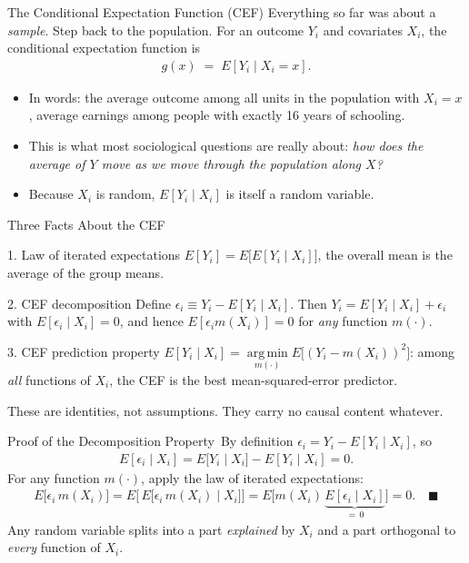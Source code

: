 \documentclass[aspectratio=169,11pt,xcolor=dvipsnames]{beamer}
\DeclareMathOperator*{\argminop}{arg\,min}
\newcommand{\argmin}{\argminop\limits}
\newcommand{\E}{E}
\newcommand{\adv}{\,\raisebox{0.6pt}{\textcolor{accent}{$\bigstar$}}}
\newcommand{\core}{\,\raisebox{0.6pt}{\textcolor{corestar}{$\bigstar$}}}
\begin{document}
\begin{frame}{The Conditional Expectation Function (CEF)}
Everything so far was about a \emph{sample}. Step back to the population.
\vskip4pt
For an outcome $Y_i$ and covariates $X_i$, the \alert{conditional expectation
function} is
\begin{align*}
  g(x) \;=\; \E[Y_i \mid X_i = x] .
\end{align*}
\begin{itemize}\itemsep4pt
  \item In words: the average outcome among all units in the population with
        $X_i = x$, average earnings among people with exactly 16 years of
        schooling.
  \item This is what most sociological questions are really about: \emph{how does
        the average of $Y$ move as we move through the population along $X$?}
  \item Because $X_i$ is random, $\E[Y_i\mid X_i]$ is itself a random variable.
\end{itemize}
\end{frame}

\begin{frame}{Three Facts About the CEF\core}
\begin{block}{1. Law of iterated expectations}
$\E[Y_i] = \E\big[\E[Y_i\mid X_i]\big]$, the overall mean is the average of
the group means.
\end{block}
\pause
\begin{block}{2. CEF decomposition}
Define $\epsilon_i \equiv Y_i - \E[Y_i\mid X_i]$. Then $Y_i = \E[Y_i\mid X_i] + \epsilon_i$
with $\E[\epsilon_i\mid X_i] = 0$, and hence $\E[\epsilon_i m(X_i)] = 0$ for
\emph{any} function $m(\cdot)$.
\end{block}
\pause
\begin{block}{3. CEF prediction property}
$\E[Y_i\mid X_i] = \argmin_{m(\cdot)} \E\big[(Y_i - m(X_i))^2\big]$: among
\emph{all} functions of $X_i$, the CEF is the best mean-squared-error predictor.
\end{block}
\vskip2pt
\alert{These are identities, not assumptions.} They carry no causal content
whatever.
\end{frame}

\begin{frame}{Proof of the Decomposition Property\adv}
By definition $\epsilon_i = Y_i - \E[Y_i\mid X_i]$, so
\begin{align*}
  \E[\epsilon_i \mid X_i]
  = \E\big[Y_i \mid X_i\big] - \E[Y_i\mid X_i] = 0 .
\end{align*}
For any function $m(\cdot)$, apply the law of iterated expectations:
\begin{align*}
  \E\big[\epsilon_i\, m(X_i)\big]
  = \E\Big[\, \E\big[\epsilon_i\, m(X_i) \mid X_i \big] \Big]
  = \E\Big[ m(X_i)\, \underbrace{\E[\epsilon_i \mid X_i]}_{=\,0} \Big]
  = 0 . \quad\blacksquare
\end{align*}
\vskip4pt
Any random variable splits into a part \emph{explained} by $X_i$ and a part
orthogonal to \emph{every} function of $X_i$.
\end{frame}
\end{document}

